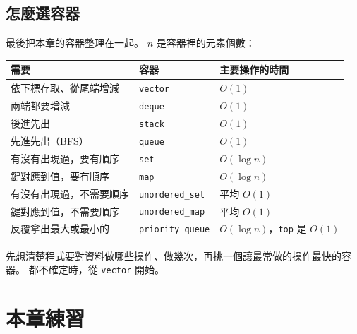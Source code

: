 \subsection{怎麼選容器}

最後把本章的容器整理在一起。 $n$ 是容器裡的元素個數：

\begin{center}
\begin{tabular}{lll}
\toprule
需要 & 容器 & 主要操作的時間 \\
\midrule
依下標存取、從尾端增減 & \texttt{vector} & $O(1)$ \\
兩端都要增減 & \texttt{deque} & $O(1)$ \\
後進先出 & \texttt{stack} & $O(1)$ \\
先進先出（BFS） & \texttt{queue} & $O(1)$ \\
有沒有出現過，要有順序 & \texttt{set} & $O(\log n)$ \\
鍵對應到值，要有順序 & \texttt{map} & $O(\log n)$ \\
有沒有出現過，不需要順序 & \texttt{unordered\_set} & 平均 $O(1)$ \\
鍵對應到值，不需要順序 & \texttt{unordered\_map} & 平均 $O(1)$ \\
反覆拿出最大或最小的 & \texttt{priority\_queue} & $O(\log n)$，\texttt{top} 是 $O(1)$ \\
\bottomrule
\end{tabular}
\end{center}

先想清楚程式要對資料做哪些操作、做幾次，再挑一個讓最常做的操作最快的容
器。 都不確定時，從 \texttt{vector} 開始。

\section{本章練習}
\label{sec:ch8-exercises}

